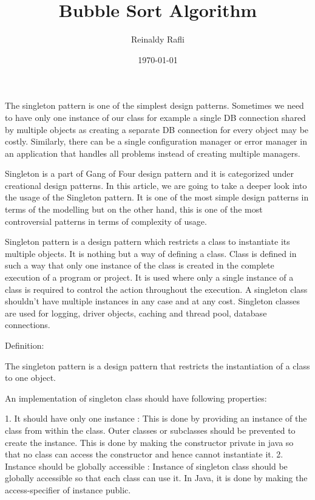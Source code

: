 \documentclass{article}
\author{Reinaldy Rafli}
\date{\today}
\title{Bubble Sort Algorithm}
\begin{document}
\maketitle

The singleton pattern is one of the simplest design patterns. Sometimes we need to have only one instance of our class 
for example a single DB connection shared by multiple objects as creating a separate DB connection for every object 
may be costly. Similarly, there can be a single configuration manager or error manager in an application that handles all 
problems instead of creating multiple managers.

Singleton is a part of Gang of Four design pattern and it is categorized under creational design patterns. 
In this article, we are going to take a deeper look into the usage of the Singleton pattern. 
It is one of the most simple design patterns in terms of the modelling but on the other hand, this is one of the most 
controversial patterns in terms of complexity of usage.

Singleton pattern is a design pattern which restricts a class to instantiate its multiple objects. It is nothing but 
a way of defining a class. Class is defined in such a way that only one instance of the class is created in the complete 
execution of a program or project. It is used where only a single instance of a class is required to control the action 
throughout the execution. A singleton class shouldn’t have multiple instances in any case and at any cost. 
Singleton classes are used for logging, driver objects, caching and thread pool, database connections.

Definition: 

The singleton pattern is a design pattern that restricts the instantiation of a class to one object. 

An implementation of singleton class should have following properties:

1. It should have only one instance : This is done by providing an instance of the class from within the class. 
Outer classes or subclasses should be prevented to create the instance. This is done by making the constructor private
in java so that no class can access the constructor and hence cannot instantiate it.
2. Instance should be globally accessible : Instance of singleton class should be globally accessible so that each class
can use it. In Java, it is done by making the access-specifier of instance public.
\end{document}
